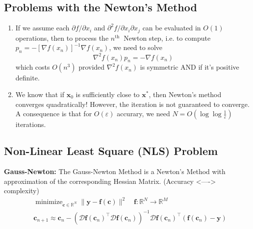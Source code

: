 \documentclass[11pt]{article}
\theoremstyle{plain} %
\newenvironment{topic}
{\color{C2}\normalfont\begin{framed}\begingroup }
  {\endgroup\end{framed}}
\theoremstyle{remark}
\begin{document}
\subsection{Problems with the Newton's Method}
\begin{topic}
  \begin{enumerate}
    \item If we assume each $\partial f / \partial x_i$ and $\partial^2 f /
            \partial x_i \partial x_j$ can be evaluated in $O(1)$ operations, then to
          process the $n^{\text {th }}$ Newton step, i.e. to compute $p_n=-\left[\nabla
              f\left(x_n\right)\right]^{-1} \nabla f\left(x_n\right)$, we need to solve
          $$
            \nabla^2 f\left(x_n\right) p_n=-\nabla f\left(x_n\right)
          $$
          which costs $O\left(n^3\right)$ provided $\nabla^2 f\left(x_n\right)$ is
          symmetric AND if it's positive definite.
    \item We know that if $\mathbf{x}_0$ is sufficiently close to
          $\mathbf{x}^*$, then Newton's method converges quadratically! However, the
          iteration is not guaranteed to converge. A consequence is that for $O(\varepsilon)$ accurary, we need $N=O\left(\log \log \frac{1}{\varepsilon}\right)$ iterations.
  \end{enumerate}
\end{topic}

\subsection{Non-Linear Least Square (NLS) Problem}
\begin{topic}
  \textbf{Gauss-Newton:}
  The Gauss-Newton Method is a Newton's Method with approximation of the corresponding Hessian Matrix. (Accuracy <----> complexity)
  $$
    \begin{aligned}
       & \operatorname{minimize}_{\mathbf{c} \in \mathbb{R}^N} \|\mathbf{y}-\mathbf{f}(\mathbf{c})\|^2 \quad \mathbf{f}: \mathbb{R}^N \rightarrow \mathbb{R}^M                                                                                           \\
       & \mathbf{c}_{n+1} \approx \mathbf{c}_n-\left(\mathcal{D} \mathbf{f}(\mathbf{c}_n)^{\top} \mathcal{D} \mathbf{f}(\mathbf{c}_n)\right)^{-1} \mathcal{D} \mathbf{f}(\mathbf{c}_n)^{\top}\left(\mathbf{f}\left(\mathbf{c}_n\right)-\mathbf{y}\right)
    \end{aligned}
  $$
\end{topic}
\end{document}
